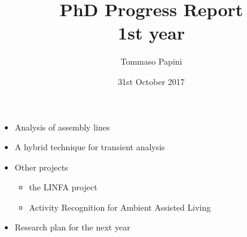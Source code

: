 
\title[PhD Progress Report: 1st year]{
  PhD Progress Report\\
  1st year
}
\author{
  Tommaso Papini
}
\date{
  31st October 2017
}
  
\begin{frame}
  \titlepage
  
  \begin{itemize}
    \item Analysis of assembly lines
    \item A hybrid technique for transient analysis
    \item Other projects
    \begin{itemize}
      \item the LINFA project
      \item Activity Recognition for Ambient Assisted Living
    \end{itemize}
    \item Research plan for the next year
  \end{itemize}
\end{frame}